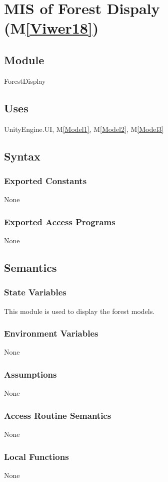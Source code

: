\documentclass[12pt, titlepage]{article}
\newcommand{\mref}[1]{M\ref{#1}}
\begin{document}
\section{MIS of Forest Dispaly (\mref{Viwer18})} 

\subsection{Module}
ForestDisplay

\subsection{Uses}
UnityEngine.UI, \mref{Model1}, \mref{Model2}, \mref{Model3}

\subsection{Syntax}

\subsubsection{Exported Constants}
None
\subsubsection{Exported Access Programs}
None

\subsection{Semantics}
\subsubsection{State Variables}
This module is used to display the forest models.
\subsubsection{Environment Variables}
None
\subsubsection{Assumptions}
None
\subsubsection{Access Routine Semantics}
None
\subsubsection{Local Functions}
None
\end{document}
